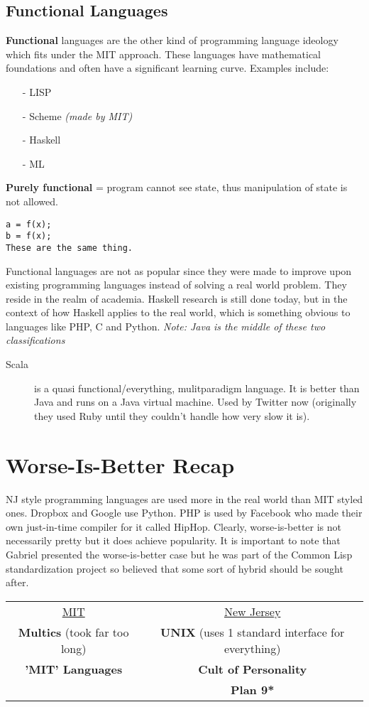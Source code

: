 \documentclass[twoside]{article}
\begin{document}
\subsection{Functional Languages}
\textbf{Functional} languages are the other kind of programming language ideology which fits under the MIT approach. These languages have mathematical foundations and often have a significant learning curve. Examples include:
\begin{itemize}
\item[-] LISP
\item[-] Scheme \emph{(made by MIT)}
\item[-] Haskell
\item[-] ML
\end{itemize}
\textbf{Purely functional} = program cannot see state, thus manipulation of state is not allowed. \begin{verbatim}a = f(x);
b = f(x);
These are the same thing.
\end{verbatim}
Functional languages are not as popular since they were made to improve upon existing programming languages  instead of solving a real world problem. They reside in the realm of academia. Haskell research is still done today, but in the context of how Haskell applies to the real world, which is something obvious to languages like PHP, C and Python. \emph{Note: Java is the middle of these two classifications}
\begin{description}
\item[Scala] is a quasi functional/everything, mulitparadigm language. It is better than Java and runs on a Java virtual machine. Used by Twitter now (originally they used Ruby until they couldn't handle how very slow it is).
\end{description}
\section{Worse-Is-Better Recap}
NJ style programming languages are used more in the real world than MIT styled ones. Dropbox and Google use Python. PHP is used by Facebook who made their own just-in-time compiler for it called HipHop. Clearly, worse-is-better is not necessarily pretty but it does achieve popularity. It is important to note that Gabriel presented the worse-is-better case but he was part of the Common Lisp standardization project so believed that some sort of hybrid should be sought after. \\
\begin{table}[h]
\centering
\begin{tabular}{cc}
{\Large \underline{MIT}} &{\Large \underline{New Jersey}}\\
\textbf{Multics} (took far too long)			& 	\textbf{UNIX} (uses 1 standard interface for everything)\\
\textbf{'MIT' Languages}	&	\textbf{Cult of Personality} \\
			 	& 	\textbf{Plan 9*} \\
\end{tabular}
\end{table}
\end{document}
